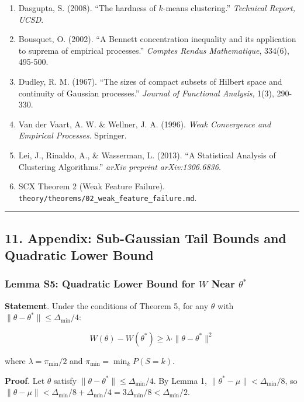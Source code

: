 \documentclass[
  12pt,
]{ctexart}
\begin{document}
\begin{enumerate}
{  Learning}, 75(2), 245-248.
\item
  Dasgupta, S. (2008). ``The hardness of \(k\)-means clustering.''
  \emph{Technical Report, UCSD}.
\item
  Bousquet, O. (2002). ``A Bennett concentration inequality and its
  application to suprema of empirical processes.'' \emph{Comptes Rendus
  Mathematique}, 334(6), 495-500.
\item
  Dudley, R. M. (1967). ``The sizes of compact subsets of Hilbert space
  and continuity of Gaussian processes.'' \emph{Journal of Functional
  Analysis}, 1(3), 290-330.
\item
  Van der Vaart, A. W. \& Wellner, J. A. (1996). \emph{Weak Convergence
  and Empirical Processes}. Springer.
\item
  Lei, J., Rinaldo, A., \& Wasserman, L. (2013). ``A Statistical
  Analysis of Clustering Algorithms.'' \emph{arXiv preprint
  arXiv:1306.6836}.
\item
  SCX Theorem 2 (Weak Feature Failure).
  \texttt{theory/theorems/02\_weak\_feature\_failure.md}.
\end{enumerate}

\begin{center}\rule{0.5\linewidth}{0.5pt}\end{center}

\subsection{11. Appendix: Sub-Gaussian Tail Bounds and Quadratic Lower
Bound}\label{appendix-sub-gaussian-tail-bounds-and-quadratic-lower-bound}

\subsubsection{\texorpdfstring{Lemma S5: Quadratic Lower Bound for \(W\)
Near
\(\theta^*\)}{Lemma S5: Quadratic Lower Bound for W Near \textbackslash theta\^{}*}}\label{lemma-s5-quadratic-lower-bound-for-w-near-theta}

\textbf{Statement}. Under the conditions of Theorem 5, for any
\(\theta\) with \(\|\theta - \theta^*\| \leq \Delta_{\min}/4\):

\[W(\theta) - W(\theta^*) \geq \lambda \cdot \|\theta - \theta^*\|^2\]

where \(\lambda = \pi_{\min} / 2\) and \(\pi_{\min} = \min_k P(S = k)\).

\textbf{Proof}. Let \(\theta\) satisfy
\(\|\theta - \theta^*\| \leq \Delta_{\min}/4\). By Lemma 1,
\(\|\theta^* - \mu\| < \Delta_{\min}/8\), so
\(\|\theta - \mu\| < \Delta_{\min}/8 + \Delta_{\min}/4 = 3\Delta_{\min}/8 < \Delta_{\min}/2\).
\end{document}
